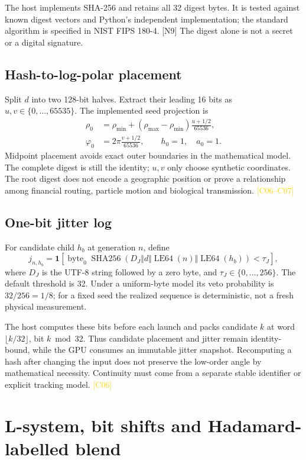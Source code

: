 \documentclass[11pt,a4paper]{article}
\newcommand{\ext}[1]{\textcolor{muted}{[N#1]}}
\newcommand{\corr}[1]{\textcolor{gold}{\textsf{[#1]}}}
\newcommand{\code}[1]{\texttt{\detokenize{#1}}}
\newcommand{\ph}{\varphi}
\newcommand{\ind}{\mathbf{1}}
\newcommand{\sha}{\operatorname{SHA256}}
\begin{document}
The host implements SHA-256 and retains all 32 digest bytes. It is tested against known digest vectors and Python's independent implementation; the standard algorithm is specified in NIST FIPS 180-4. \ext{9} The digest alone is not a secret or a digital signature.

\subsection{Hash-to-log-polar placement}
Split $d$ into two 128-bit halves. Extract their leading 16 bits as $u,v\in\{0,\ldots,65535\}$. The implemented seed projection is
\begin{align}
 \rho_0 &= \rho_{\min}+(\rho_{\max}-\rho_{\min})\frac{u+1/2}{65536},\\
 \ph_0 &=2\pi\frac{v+1/2}{65536},\qquad h_0=1,\quad a_0=1.
\end{align}
Midpoint placement avoids exact outer boundaries in the mathematical model. The complete digest is still the identity; $u,v$ only choose synthetic coordinates. The root digest does not encode a geographic position or prove a relationship among financial routing, particle motion and biological transmission. \corr{C06--C07}

\subsection{One-bit jitter log}
For candidate child $h_b$ at generation $n$, define
\begin{equation}
 j_{n,h_b}=\ind\!\left[\operatorname{byte}_0\sha(D_J\Vert d\Vert
 \operatorname{LE64}(n)\Vert\operatorname{LE64}(h_b))<\tau_J\right],
\end{equation}
where $D_J$ is the UTF-8 string \code{atomOS:jitter:v2} followed by a zero byte, and $\tau_J\in\{0,\ldots,256\}$. The default threshold is 32. Under a uniform-byte model its veto probability is $32/256=1/8$; for a fixed seed the realized sequence is deterministic, not a fresh physical measurement.

The host computes these bits before each launch and packs candidate $k$ at word $\lfloor k/32\rfloor$, bit $k\bmod32$. Thus candidate placement and jitter remain identity-bound, while the GPU consumes an immutable jitter snapshot. Recomputing a hash after changing the input does not preserve the low-order angle by mathematical necessity. Continuity must come from a separate stable identifier or explicit tracking model. \corr{C06}
\clearpage

\section{L-system, bit shifts and Hadamard-labelled blend}
\end{document}
